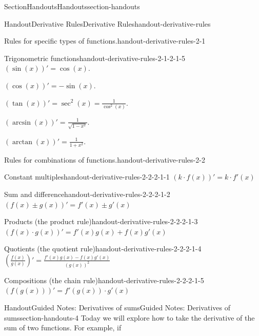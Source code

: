 \documentclass[oneside,10pt,]{article}
\numberwithin{equation}{section}
\begin{document}
\begin{sectionptx}{Section}{Handouts}{}{Handouts}{}{}{section-handouts}
\begin{handout-subsection}{Handout}{Derivative Rules}{}{Derivative Rules}{}{}{handout-derivative-rules}
\begin{paragraphs}{Rules for specific types of functions.}{handout-derivative-rules-2-1}
\begin{descriptionlist}
\begin{dlimedium}{Trigonometric functions}{handout-derivative-rules-2-1-2-1-5}
\((\sin(x))' = \cos(x)\).%
\par
\((\cos(x))' = -\sin(x)\).%
\par
\((\tan(x))' = \sec^{2}(x) = \frac{1}{\cos^{2}(x)}\).%
\par
\((\arcsin(x))' = \frac{1}{\sqrt{1-x^{2}}}\).%
\par
\((\arctan(x))' = \frac{1}{1+x^{2}}\).%
\end{dlimedium}%
\end{descriptionlist}
%
\end{paragraphs}%
\begin{paragraphs}{Rules for combinations of functions.}{handout-derivative-rules-2-2}%
%
\begin{descriptionlist}
\begin{dlimedium}{Constant multiples}{handout-derivative-rules-2-2-2-1-1}%
\(\displaystyle (k\cdot f(x))' = k\cdot f'(x)\)%
\end{dlimedium}%
\begin{dlimedium}{Sum and difference}{handout-derivative-rules-2-2-2-1-2}%
\(\displaystyle (f(x) \pm g(x))' = f'(x) \pm g'(x)\)%
\end{dlimedium}%
\begin{dlimedium}{Products (the product rule)}{handout-derivative-rules-2-2-2-1-3}%
\(\displaystyle (f(x)\cdot g(x))' = f'(x)g(x) + f(x)g'(x)\)%
\end{dlimedium}%
\begin{dlimedium}{Quotients (the quotient rule)}{handout-derivative-rules-2-2-2-1-4}%
\(\displaystyle \left(\frac{f(x)}{g(x)}\right)' = \frac{f'(x)g(x) - f(x)g'(x)}{(g(x))^{2}}\)%
\end{dlimedium}%
\begin{dlimedium}{Compositions (the chain rule)}{handout-derivative-rules-2-2-2-1-5}%
\(\displaystyle (f(g(x)))' = f'(g(x))\cdot g'(x)\)%
\end{dlimedium}%
\end{descriptionlist}
%
\end{paragraphs}%
\end{handout-subsection}
\restoregeometry
%
%
\typeout{************************************************}
\typeout{************************************************}
%
\begin{handout-subsection}{Handout}{Guided Notes: Derivatives of sums}{}{Guided Notes: Derivatives of sums}{}{}{section-handouts-4}
Today we will explore how to take the derivative of the sum of two functions.  For example, if%

\end{handout-subsection}
\end{sectionptx}
\end{document}

